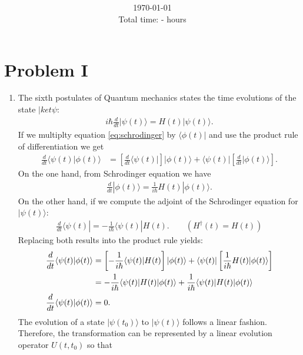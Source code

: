 \documentclass[letterpaper,11pt,twoside]{article}
\title{\textbf{\assignment}\\\course\\{\Large\institution}}
\author{\autor}
\date{\today\\Total time: - hours}
\newcommand{\ket}[1]{|#1\rangle}
\newcommand{\bra}[1]{\langle#1|}
\newcommand{\braket}[1]{\langle#1\rangle}
\begin{document}
\pagestyle{mainstyle}
\maketitle

\section*{Problem I}
\begin{enumerate}[itemsep=0pt,topsep=0pt,label=\alph*)]
  \item The sixth postulates of Quantum mechanics states the time evolutions of the state $|ket{\psi}$: 
  \begin{align}
    i\hbar\frac{d}{dt}\ket{\psi(t)}=H(t)\ket{\psi(t)}.
    \label{eq:schrodinger}
  \end{align}
  If we multiplty equation \eqref{eq:schrodinger} by $\bra{\phi(t)}$ and use the product rule of differentiation we get 
  \begin{align*}
    \frac{d}{dt}\braket{\psi(t)|\phi(t)}&=\left[\frac{d}{dt}\bra{\psi(t)}\right]\ket{\phi(t)}+\bra{\psi(t)}\left[\frac{d}{dt}\ket{\phi(t)}\right].
  \end{align*}
  On the one hand, from Schrodinger equation we have 
  \begin{align*}
    \frac{d}{dt}\ket{\phi(t)}=\frac{1}{i\hbar}H(t)\ket{\phi(t)}.
  \end{align*}
  On the other hand, if we compute the adjoint of the Schrodinger equation for $\ket{\psi(t)}$:
  \begin{align*}
    \frac{d}{dt}\bra{\psi(t)}=-\frac{1}{i\hbar}\bra{\psi(t)}H(t).\qquad(H^\dagger(t)=H(t))
  \end{align*}
  Replacing both results into the product rule yields:
  \begin{align}
    \frac{d}{dt}\braket{\psi(t)|\phi(t)}&=\left[-\frac{1}{i\hbar}\bra{\psi(t)}H(t)\right]\ket{\phi(t)}+\bra{\psi(t)}\left[\frac{1}{i\hbar}H(t)\ket{\phi(t)}\right]\notag\\
    &=-\frac{1}{i\hbar}\braket{\psi(t)|H(t)|\phi(t)}+\frac{1}{i\hbar}\braket{\psi(t)|H(t)|\phi(t)}\label{eq:interproblem1}\\
    \frac{d}{dt}\braket{\psi(t)|\phi(t)}&=0.\notag
  \end{align}
  The evolution of a state $\ket{\psi(t_0)}$ to $\ket{\psi(t)}$ follows a linear fashion. Therefore, the transformation can be represented by a linear evolution operator 
  $U(t,t_0)$ so that 
  \begin{align}

\end{align}
\end{enumerate}
\end{document}
